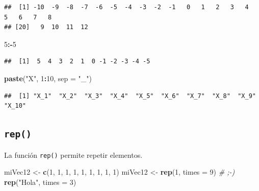 \documentclass[
]{book}
\newenvironment{Shaded}{\begin{snugshade}}{\end{snugshade}}
\newcommand{\CommentTok}[1]{\textcolor[rgb]{0.56,0.35,0.01}{\textit{#1}}}
\newcommand{\DataTypeTok}[1]{\textcolor[rgb]{0.13,0.29,0.53}{#1}}
\newcommand{\DecValTok}[1]{\textcolor[rgb]{0.00,0.00,0.81}{#1}}
\newcommand{\KeywordTok}[1]{\textcolor[rgb]{0.13,0.29,0.53}{\textbf{#1}}}
\newcommand{\NormalTok}[1]{#1}
\newcommand{\OperatorTok}[1]{\textcolor[rgb]{0.81,0.36,0.00}{\textbf{#1}}}
\newcommand{\StringTok}[1]{\textcolor[rgb]{0.31,0.60,0.02}{#1}}
\begin{document}
\begin{verbatim}
##  [1] -10  -9  -8  -7  -6  -5  -4  -3  -2  -1   0   1   2   3   4   5   6   7   8
## [20]   9  10  11  12
\end{verbatim}

\begin{Shaded}
\begin{Highlighting}[]
\DecValTok{5}\OperatorTok{:-}\DecValTok{5}
\end{Highlighting}
\end{Shaded}

\begin{verbatim}
##  [1]  5  4  3  2  1  0 -1 -2 -3 -4 -5
\end{verbatim}

\begin{Shaded}
\begin{Highlighting}[]
\KeywordTok{paste}\NormalTok{(}\StringTok{"X"}\NormalTok{, }\DecValTok{1}\OperatorTok{:}\DecValTok{10}\NormalTok{, }\DataTypeTok{sep =} \StringTok{"_"}\NormalTok{)}
\end{Highlighting}
\end{Shaded}

\begin{verbatim}
##  [1] "X_1"  "X_2"  "X_3"  "X_4"  "X_5"  "X_6"  "X_7"  "X_8"  "X_9"  "X_10"
\end{verbatim}

\hypertarget{l015rep}{%
\subsection{\texorpdfstring{\texttt{rep()}}{rep()}}\label{l015rep}}

La función \texttt{rep()} permite repetir elementos.

\begin{Shaded}
\begin{Highlighting}[]
\NormalTok{miVec12 <-}\StringTok{ }\KeywordTok{c}\NormalTok{(}\DecValTok{1}\NormalTok{, }\DecValTok{1}\NormalTok{, }\DecValTok{1}\NormalTok{, }\DecValTok{1}\NormalTok{, }\DecValTok{1}\NormalTok{, }\DecValTok{1}\NormalTok{, }\DecValTok{1}\NormalTok{, }\DecValTok{1}\NormalTok{, }\DecValTok{1}\NormalTok{)}
\NormalTok{miVec12 <-}\StringTok{ }\KeywordTok{rep}\NormalTok{(}\DecValTok{1}\NormalTok{, }\DataTypeTok{times =} \DecValTok{9}\NormalTok{) }\CommentTok{# ;-)}
\KeywordTok{rep}\NormalTok{(}\StringTok{"Hola"}\NormalTok{, }\DataTypeTok{times =} \DecValTok{3}\NormalTok{)}
\end{Highlighting}
\end{Shaded}
\end{document}
